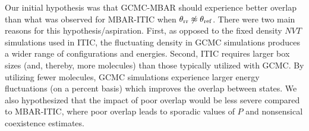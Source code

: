 \documentclass[journal=jced,manuscript=article]{achemso}
\begin{document}


Our initial hypothesis was that GCMC-MBAR should experience better overlap than what was observed for MBAR-ITIC when $\theta_{\rm rr} \not\approx \theta_{\rm ref}$. There were two main reasons for this hypothesis/aspiration. First, as opposed to the fixed density $NVT$ simulations used in ITIC, the fluctuating density in GCMC simulations produces a wider range of configurations and energies. Second, ITIC requires larger box sizes (and, thereby, more molecules) than those typically utilized with GCMC. By utilizing fewer molecules, GCMC simulations experience larger energy fluctuations (on a percent basis) which improves the overlap between states. We also hypothesized that the impact of poor overlap would be less severe compared to MBAR-ITIC, where poor overlap leads to sporadic values of $P$ and nonsensical coexistence estimates.  


\end{document}
